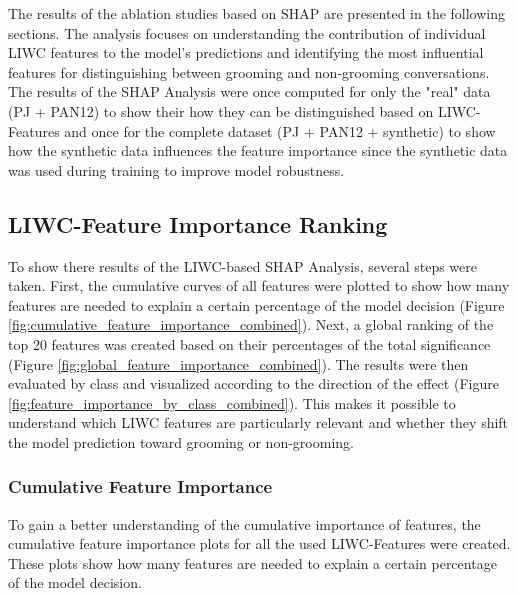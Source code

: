 The results of the ablation studies based on SHAP are presented in the following sections. The analysis focuses on understanding the contribution of individual LIWC features to the model's predictions and identifying the most influential features for distinguishing between grooming and non-grooming conversations. The results of the SHAP Analysis were once computed for only the "real" data (PJ + PAN12) to show their how they can be distinguished based on LIWC-Features and once for the complete dataset (PJ + PAN12 + synthetic) to show how the synthetic data influences the feature importance since the synthetic data was used during training to improve model robustness.

\subsection{LIWC-Feature Importance Ranking} 

To show there results of the LIWC-based SHAP Analysis, several steps were taken. First, the cumulative curves of all features were plotted to show how many features are needed to explain a certain percentage of the model decision (Figure \ref{fig:cumulative_feature_importance_combined}). Next, a global ranking of the top 20 features was created based on their percentages of the total significance (Figure \ref{fig:global_feature_importance_combined}). The results were then evaluated by class and visualized according to the direction of the effect (Figure \ref{fig:feature_importance_by_class_combined}). This makes it possible to understand which LIWC features are particularly relevant and whether they shift the model prediction toward grooming or non-grooming.


\subsubsection{Cumulative Feature Importance}

To gain a better understanding of the cumulative importance of features, the cumulative feature importance plots for all the used LIWC-Features were created. These plots show how many features are needed to explain a certain percentage of the model decision.

